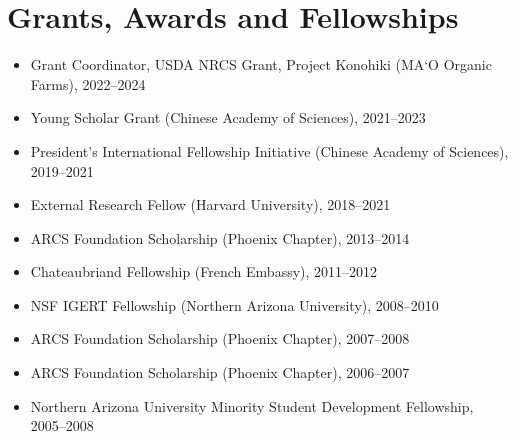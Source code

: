\documentclass[a4paper]{article}
\begin{document}
\section{Grants, Awards and Fellowships}\label{awards-and-fellowships}

\begin{itemize}
\item Grant Coordinator, USDA NRCS Grant, Project Konohiki (MA‘O Organic Farms), 2022--2024
\item Young Scholar Grant (Chinese Academy of Sciences), 2021--2023
\item President's International Fellowship Initiative (Chinese Academy
  of Sciences), 2019--2021
\item External Research Fellow (Harvard University), 2018--2021
\item
  ARCS Foundation Scholarship (Phoenix Chapter), 2013--2014
\item
  Chateaubriand Fellowship (French Embassy), 2011--2012
\item
  NSF IGERT Fellowship (Northern Arizona University), 2008--2010
\item
  ARCS Foundation Scholarship (Phoenix Chapter), 2007--2008
\item
  ARCS Foundation Scholarship (Phoenix Chapter), 2006--2007
\item
  Northern Arizona University Minority Student Development Fellowship,
  2005--2008
\end{itemize}
\end{document}
